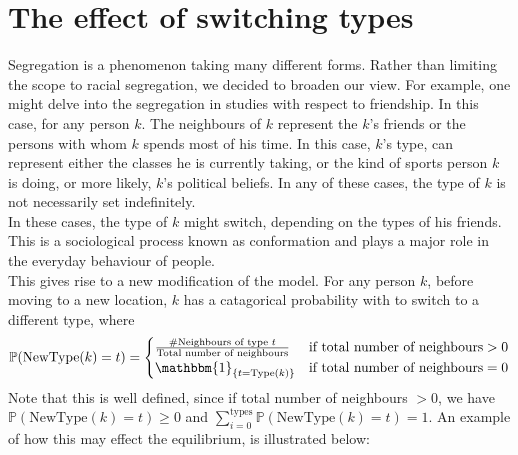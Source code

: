 \section{The effect of switching types}
\label{section:switch}
Segregation is a phenomenon taking many different forms. Rather than  limiting the scope to racial segregation, we decided to broaden our view. 
For example, one might delve into the segregation in studies with respect to friendship. 
In this case, for any person \(k\). The neighbours of \(k\) represent the \(k\)'s friends or the persons with whom \(k\) spends most of his time.
In this case, \(k\)'s type, can represent either the classes he is currently taking, or the kind of sports person \(k\) is doing, or more likely, \(k\)'s political beliefs.
In any of these cases, the type of \(k\) is not necessarily set indefinitely.\\
In these cases, the type of \(k\) might switch, depending on the types of his friends. This is a sociological process known as conformation and plays a major role in the everyday behaviour of people.\\


This gives rise to a new modification of the model.
For any person \(k\), before moving to a new location, \(k\) has a catagorical probability with to switch to a different type, where 
\[\mathbb{P}(\text{NewType}(k)=t) = \begin{cases} 
 \frac{\#\text{Neighbours of type }t}{\text{Total number of neighbours}}	&\mbox{if } \text{total number of neighbours}>0 \\ 
\mathbbm{1}_{\{t=\text{Type}(k)\}}   &\mbox{if } \text{total number of neighbours}=0
\end{cases}\]
Note that this is well defined, since if total number of neighbours \(> 0\), we have \( \mathbb{P}(\text{NewType}(k)=t) \geq 0\) and \(\sum_{i=0}^{\text{types}}\mathbb{P}(\text{NewType}(k)=t)=1\). An example of how this may effect the equilibrium, is illustrated below:

